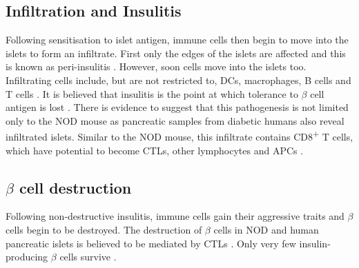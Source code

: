 




\subsection{Infiltration and Insulitis}

Following sensitisation to islet antigen, immune cells then begin to move into the islets to form an infiltrate.
First only the edges of the islets are affected and this is known as peri-insulitis \citep{Thomas2000}.
However, soon cells move into the islets too.
Infiltrating cells include, but are not restricted to, DCs, macrophages, B cells and T cells \citep{Brodie2008}.
It is believed that insulitis is the point at which tolerance to $\beta$ cell antigen is lost \citep{Thomas2000}.
There is evidence to suggest that this pathogenesis is not limited only to the NOD mouse as pancreatic samples from diabetic humans also reveal infiltrated islets.
Similar to the NOD mouse, this infiltrate contains CD8\textsuperscript{+} T cells, which have potential to become CTLs, other lymphocytes and APCs \citep{Hanafusa2008}.

\subsection{$\beta$ cell destruction}

Following non-destructive insulitis, immune cells gain their aggressive traits and $\beta$ cells begin to be destroyed.
The destruction of $\beta$ cells in NOD and human pancreatic islets is believed to be mediated by CTLs \citep{Thomas2000, Brodie2008, Hanafusa2008}.
Only very few insulin-producing $\beta$ cells survive \citep{Oram2014, Veld2014}.



